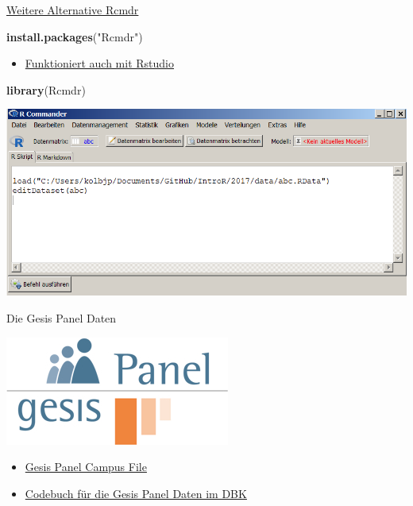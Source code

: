\documentclass[ignorenonframetext,]{beamer}
\newenvironment{Shaded}{}{}
\newcommand{\KeywordTok}[1]{\textcolor[rgb]{0.00,0.44,0.13}{\textbf{{#1}}}}
\newcommand{\StringTok}[1]{\textcolor[rgb]{0.25,0.44,0.63}{{#1}}}
\newcommand{\NormalTok}[1]{{#1}}
\providecommand{\tightlist}{%
\setlength{\itemsep}{0pt}\setlength{\parskip}{0pt}}
\begin{document}
\begin{frame}[fragile]{\href{https://cran.r-project.org/web/packages/Rcmdr/index.html}{Weitere
Alternative Rcmdr}}

\begin{Shaded}
\begin{Highlighting}[]
\KeywordTok{install.packages}\NormalTok{(}\StringTok{"Rcmdr"}\NormalTok{)}
\end{Highlighting}
\end{Shaded}

\begin{itemize}
\tightlist
\item
  \href{http://www.rcommander.com/}{Funktioniert auch mit Rstudio}
\end{itemize}

\begin{Shaded}
\begin{Highlighting}[]
\KeywordTok{library}\NormalTok{(Rcmdr)}
\end{Highlighting}
\end{Shaded}

\includegraphics{./tex2pdf.956/7fc6300bc58e78aaaf7433492aaeaa8d1319075c.png}

\end{frame}

\begin{frame}{Die Gesis Panel Daten}

\includegraphics{./tex2pdf.956/5e78f32f301eb9cbc23cee28d482621ebc199870.jpg}

\begin{itemize}
\item
  \href{http://www.gesis.org/gesis-panel/data/gesis-panel-campus-file/}{Gesis
  Panel Campus File}
\item
  \href{https://dbk.gesis.org/dbksearch/SDesc2.asp?ll=10\&notabs=\&af=\&nf=\&search=gesis\%20panel\&search2=\&db=D\&no=5665}{Codebuch
  für die Gesis Panel Daten im DBK}
\end{itemize}

\end{frame}
\end{document}
